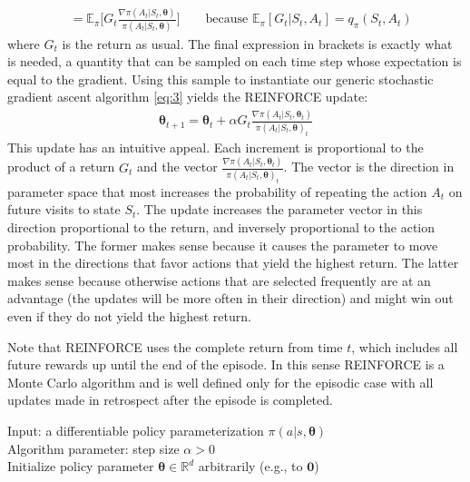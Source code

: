 {\begin{align*}
    &=\mathbb{E}_\pi\Big[G_t\frac{\nabla\pi(A_t|S_t, \bm{\theta})}{\pi(A_t|S_t, \bm{\theta})}\Big] \qquad\text{because $\mathbb{E}_\pi[G_t|S_t,A_t]=q_\pi(S_t, A_t)$}
\end{align*}
where $G_t$ is the return as usual. The final expression in brackets is exactly what is needed, a quantity that can be sampled on each time step whose expectation is equal to the gradient. Using this sample to instantiate our generic stochastic gradient ascent algorithm \ref{eq:3} yields the REINFORCE update:
\begin{align}\label{eq:4}
\bm{\theta}_{t+1} = \bm{\theta}_t + \alpha G_t\frac{\nabla\pi(A_t|S_t, \bm{\theta}_t)}{\pi(A_t|S_t, \bm{\theta})_t}
\end{align}
This update has an intuitive appeal. Each increment is proportional to the product of a return $G_t$ and the vector $\frac{\nabla\pi(A_t|S_t, \bm{\theta}_t)}{\pi(A_t|S_t, \bm{\theta})_t}$. The vector is the direction in parameter space that most increases the probability of repeating the action $A_t$ on future visits to state $S_t$.
The update increases the parameter vector in this direction proportional to the return, and inversely proportional to the action probability. The former makes sense because it causes the parameter to move most in the directions that favor actions that yield the highest return. The latter makes sense because otherwise actions that are selected frequently are at an advantage (the updates will be more often in their direction) and might win out even if they do not yield the highest return.

Note that REINFORCE uses the complete return from time $t$, which includes all future rewards up until the end of the episode. In this sense REINFORCE is a Monte Carlo algorithm and is well defined only for the episodic case with all updates made in retrospect after the episode is completed.

\begin{tcolorbox}[colback=black!7!white,colframe=black!75!white,title=\textbf{REINFORCE: Monte-Carlo Policy-Gradient Control (episodic) for $\pi_*$}]
Input: a differentiable policy parameterization $\pi(a|s,\bm{\theta})$\\
Algorithm parameter: step size $\alpha > 0$\\
Initialize policy parameter $\bm{\theta}\in\mathbb{R}^d$ arbitrarily (e.g., to $\bm{0}$)\\


\end{tcolorbox}}
